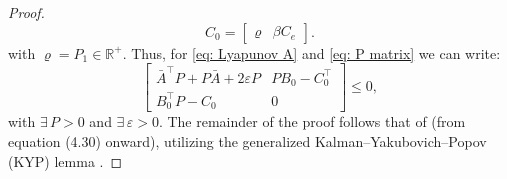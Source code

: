 \begin{proof}
\begin{equation}
 C_0=\begin{bmatrix}
\varrho & \beta C_e
\end{bmatrix}.
\label{eq. C0B0 proof}
\end{equation}
with $\varrho=P_1 \in \mathbb{R}^{+}$. Thus, for \eqref{eq: Lyapunov A} and \eqref{eq: P matrix} we can write:
\begin{equation}
    \label{eq: KYP}
\begin{bmatrix}
    \bar{A}^\top P+P\bar{A}+2\varepsilon P & PB_0-C_0^\top \\
     B_0^\top P-C_0 & 0
\end{bmatrix}\leq0,
\end{equation}
with $\exists\, P>0$ and $\exists \,\varepsilon>0$. The remainder of the proof follows that of \cite[Proposition 4.5]{banos2012reset} (from equation (4.30) onward), utilizing the generalized Kalman–Yakubovich–Popov (KYP) lemma \cite{rantzer1996kalman}.





\end{proof}




